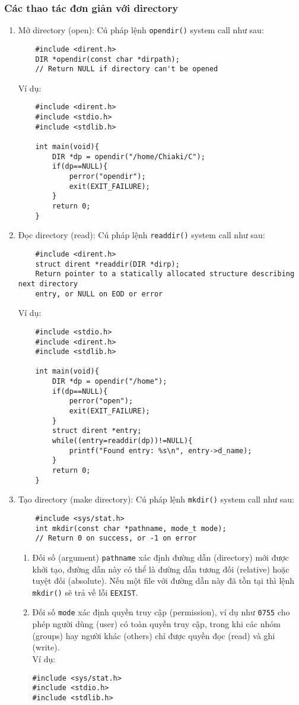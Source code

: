\documentclass{article}
\begin{document}
\subsubsection{Các thao tác đơn giản với directory}
\begin{enumerate}
\item Mở directory (open): Cú pháp lệnh \verb|opendir()| system call như sau:
\begin{verbatim}
    #include <dirent.h>
    DIR *opendir(const char *dirpath);
    // Return NULL if directory can't be opened
\end{verbatim}
Ví dụ:
    \begin{verbatim}
    #include <dirent.h>
    #include <stdio.h>
    #include <stdlib.h>
        
    int main(void){
        DIR *dp = opendir("/home/Chiaki/C");
        if(dp==NULL){
            perror("opendir");
            exit(EXIT_FAILURE);
        }
        return 0;
    }   
    \end{verbatim}
    \item Đọc directory (read): Cú pháp lệnh \verb|readdir()| system call như sau:
    \begin{verbatim}
    #include <dirent.h>
    struct dirent *readdir(DIR *dirp);
    Return pointer to a statically allocated structure describing next directory
    entry, or NULL on EOD or error
    \end{verbatim}
    Ví dụ:
    \begin{verbatim}
    #include <stdio.h>
    #include <dirent.h>
    #include <stdlib.h>
        
    int main(void){
        DIR *dp = opendir("/home");
        if(dp==NULL){
            perror("open");
            exit(EXIT_FAILURE);
        }
        struct dirent *entry;
        while((entry=readdir(dp))!=NULL){
            printf("Found entry: %s\n", entry->d_name);
        }
        return 0;
    }
    \end{verbatim}
\item Tạo directory (make directory): Cú pháp lệnh \verb|mkdir()| system call như sau:
    \begin{verbatim}
    #include <sys/stat.h>
    int mkdir(const char *pathname, mode_t mode);
    // Return 0 on success, or -1 on error
    \end{verbatim}
    \begin{enumerate}
        \item Đối số (argument) \verb|pathname| xác định đường dẫn (directory) mới được khởi tạo, đường dẫn này có thể là đường dẫn tương đối (relative) hoặc tuyệt đối (absolute).
         Nếu một file với đường dẫn này đã tồn tại thì lệnh \verb|mkdir()| sẽ trả về lỗi \verb|EEXIST|. 
         \item Đối số \verb|mode| xác định quyền truy cập (permission), ví dụ như \verb|0755| cho phép người dùng (user) có toàn quyền truy cập, trong khi các nhóm (groups) hay người khác (others) chỉ được quyền đọc (read) và ghi (write).
\\ Ví dụ:
\begin{verbatim}
#include <sys/stat.h>
#include <stdio.h>
#include <stdlib.h>


\end{verbatim}
\end{enumerate}
\end{enumerate}
\end{document}
